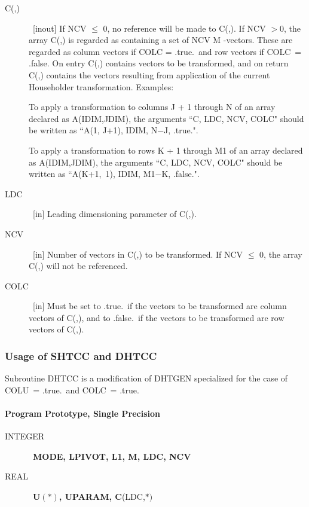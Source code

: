 \documentclass[twoside]{MATH77}
\begin{document}
\begin{description}
\item[C(,)] \ [inout] If NCV $\leq$ 0, no reference will be made to C(,).
If NCV $> 0$, the array C(,) is regarded as containing a set of NCV M%
-vectors. These are regarded as column vectors if COLC = .true.\ and row
vectors if COLC\ = .false. On entry C(,) contains vectors to be
transformed, and on return C(,) contains the vectors resulting from
application of the current Householder transformation. Examples:

To apply a transformation to columns J + 1 through N of an array declared
as A(IDIM,JDIM), the arguments ``C, LDC, NCV, COLC" should be written as
``A(1, J+1), IDIM, N$-$J, .true.".

To apply a transformation to rows K + 1 through M1 of an array declared as
A(IDIM,JDIM), the arguments ``C, LDC, NCV, COLC" should be written as
``A(K+1,~1), IDIM, M1$-$K, .false.".

\item[LDC] \ [in] Leading dimensioning parameter of C(,).

\item[NCV] \ [in] Number of vectors in C(,) to be transformed. If
NCV $\leq $ 0, the array C(,) will not be referenced.

\item[COLC] \ [in] Must be set to .true.\ if the vectors to be transformed are column
vectors of C(,), and to .false.\ if the vectors to be transformed are row
vectors of C(,).
\end{description}

\subsubsection{Usage of SHTCC and DHTCC}

Subroutine DHTCC is a modification of DHTGEN specialized for the case of
COLU\ = .true.\ and COLC\ = .true.

\paragraph{Program Prototype, Single Precision}

\begin{description}

\item[INTEGER] \ {\bf MODE, LPIVOT, L1, M, LDC, NCV}

\item[REAL] \ {\bf U}$(*)${\bf , UPARAM, C}(LDC,$*)$

\end{description}
\end{document}
